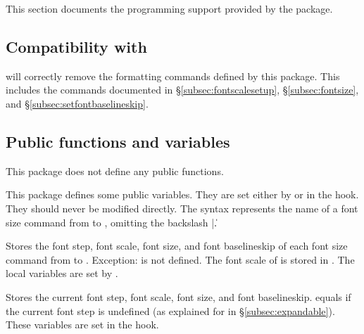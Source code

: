 \documentclass{beery}
\begin{document}
This section documents the  programming support provided by the  package.

\subsection{Compatibility with }
\label{subsec:textpurify}

 will correctly remove the formatting commands defined by this package.
This includes the commands documented in \S\ref{subsec:fontscalesetup}, \S\ref{subsec:fontsize}, and \S\ref{subsec:setfontbaselineskip}.

\subsection{Public functions and variables}
\label{subsec:publicexpl3}

This package does not define any public  functions.

This package defines some public  variables.
They are set either by  or in the  hook.
They should never be modified directly.
The syntax  represents the name of a font size command from  to , omitting the backslash |\|.

\begin{displaycode}
  \nopagebreak\newline
  \newline
  \nopagebreak\newline
\end{displaycode}

Stores the font step, font scale, font size, and font baselineskip of each font size command from  to .
Exception:
 is not defined.
The font scale of  is stored in .
The local variables are set by .

\begin{displaycode}
  \nopagebreak\newline
  \newline
  \nopagebreak\newline
\end{displaycode}

Stores the current font step, font scale, font size, and font baselineskip.
 equals  if the current font step is undefined (as explained for  in \S\ref{subsec:expandable}).
These variables are set in the  hook.
\end{document}
